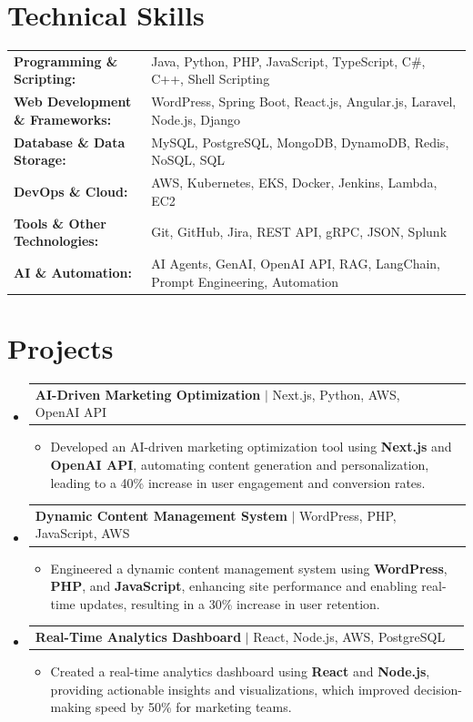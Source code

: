 \documentclass[letterpaper,10pt]{article}
\makeatletter
\newcommand{\resumeItem}[1]{
  \item{\fontsize{8pt}{9pt}\selectfont
    #1 \vspace{-3pt}
  }
}
\newcommand{\resumeProjectHeading}[2]{
    \item
    \begin{tabular*}{1.001\textwidth}{l@{\extracolsep{\fill}}r}
      \fontsize{8.5pt}{10pt}#1 & \textbf{\fontsize{8.5pt}{10pt} #2}\\
    \end{tabular*}\vspace{-7pt}
}
\newcommand{\resumeSubHeadingListStart}{\begin{itemize}[leftmargin=0pt, label={}]}
\newcommand{\resumeSubHeadingListEnd}{\end{itemize}}
\newcommand{\resumeItemListStart}{\begin{itemize}[leftmargin=*]}
\newcommand{\resumeItemListEnd}{\end{itemize}\vspace{-5pt}}
\makeatother
\begin{document}
\section{Technical Skills}
        \vspace{-14pt}
        \begin{table}[h]
            \fontsize{8pt}{9pt}\selectfont
            \begin{tabular}{p{0.3\linewidth} p{0.7\linewidth}}
                \textbf{Programming \& Scripting:} & Java, Python, PHP, JavaScript, TypeScript, C\#, C++, Shell Scripting \\
                \textbf{Web Development \& Frameworks:} & WordPress, Spring Boot, React.js, Angular.js, Laravel, Node.js, Django \\
                \textbf{Database \& Data Storage:} & MySQL, PostgreSQL, MongoDB, DynamoDB, Redis, NoSQL, SQL \\
                \textbf{DevOps \& Cloud:} & AWS, Kubernetes, EKS, Docker, Jenkins, Lambda, EC2 \\
                \textbf{Tools \& Other Technologies:} & Git, GitHub, Jira, REST API, gRPC, JSON, Splunk \\
                \textbf{AI \& Automation:} & AI Agents, GenAI, OpenAI API, RAG, LangChain, Prompt Engineering, Automation \\
            \end{tabular}
        \end{table}
 \vspace{-18pt}

\section{Projects}
    \vspace{-5pt}
    \resumeSubHeadingListStart
          \resumeProjectHeading
            {\textbf{AI-Driven Marketing Optimization} $|$ Next.js, Python, AWS, OpenAI API}{}
            \resumeItemListStart
                \resumeItem{Developed an AI-driven marketing optimization tool using \textbf{Next.js} and \textbf{OpenAI API}, automating content generation and personalization, leading to a 40\% increase in user engagement and conversion rates.}
            \resumeItemListEnd
        \vspace{-12pt}
    
        \resumeProjectHeading
            {\textbf{Dynamic Content Management System} $|$ WordPress, PHP, JavaScript, AWS}{}
        \resumeItemListStart
                \resumeItem{Engineered a dynamic content management system using \textbf{WordPress}, \textbf{PHP}, and \textbf{JavaScript}, enhancing site performance and enabling real-time updates, resulting in a 30\% increase in user retention.}
        \resumeItemListEnd
      \vspace{-12pt}
      \resumeProjectHeading
        {\textbf{Real-Time Analytics Dashboard} $|$ React, Node.js, AWS, PostgreSQL}{}
    \resumeItemListStart
            \resumeItem{Created a real-time analytics dashboard using \textbf{React} and \textbf{Node.js}, providing actionable insights and visualizations, which improved decision-making speed by 50\% for marketing teams.}
    \resumeItemListEnd
    \resumeSubHeadingListEnd
\end{document}
